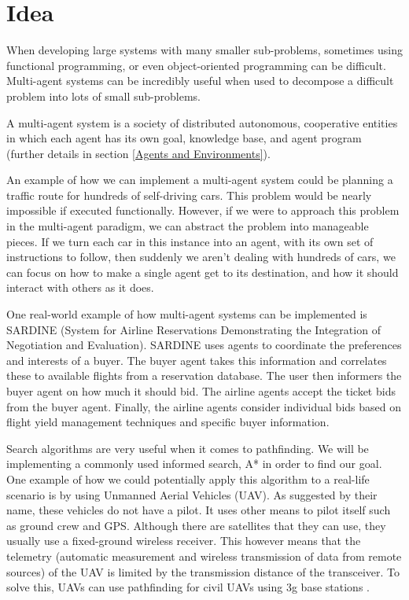 \documentclass[]{final_report}
\begin{document}
\section{Idea}

When developing large systems with many smaller sub-problems, sometimes using functional programming, or even object-oriented programming can be difficult. Multi-agent systems can be incredibly useful when used to decompose a difficult problem into lots of small sub-problems. 

A multi-agent system is a society of distributed autonomous, cooperative entities\cite{leitao2013multi} in which each agent has its own goal, knowledge base, and agent program (further details in section \ref{Agents and Environments}).

An example of how we can implement a multi-agent system could be planning a traffic route for hundreds of self-driving cars. This problem would be nearly impossible if executed functionally. However, if we were to approach this problem in the multi-agent paradigm, we can abstract the problem into manageable pieces. If we turn each car in this instance into an agent, with its own set of instructions to follow, then suddenly we aren't dealing with hundreds of cars, we can focus on how to make a single agent get to its destination, and how it should interact with others as it does. 

One real-world example of how multi-agent systems can be implemented is SARDINE (System for Airline Reservations Demonstrating the Integration of Negotiation and Evaluation). SARDINE uses agents to coordinate the preferences and interests of a buyer. The buyer agent takes this information and correlates these to available flights from a reservation database. The user then informers the buyer agent on how much it should bid. The airline agents accept the ticket bids from the buyer agent. Finally, the airline agents consider individual bids based on flight yield management techniques and specific buyer information\cite{oprea2004applications}.

Search algorithms are very useful when it comes to pathfinding. We will be implementing a commonly used informed search, A* in order to find our goal. One example of how we could potentially apply this algorithm to a real-life scenario is by using Unmanned Aerial Vehicles (UAV). As suggested by their name, these vehicles do not have a pilot. It uses other means to pilot itself such as ground crew and GPS. Although there are satellites that they can use, they usually use a fixed-ground wireless receiver. This however means that the telemetry (automatic measurement and wireless transmission of data from remote sources) of the UAV is limited by the transmission distance of the transceiver. To solve this, UAVs can use pathfinding for civil UAVs using 3g base stations \cite{6998482}.
\end{document}
